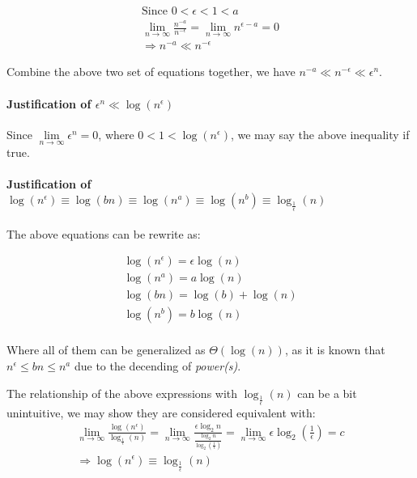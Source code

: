 \documentclass[12pt]{article}
\begin{document}
\begin{gather}
    \text{Since } 0 < \epsilon < 1 < a \\
    \lim\limits_{n \to \infty} \frac{n^{-a}}{n^{-\epsilon}} = \lim\limits_{n \to \infty} n^{\epsilon - a} = 0 \\
    \Longrightarrow n^{-a} \ll n^{-\epsilon}
\end{gather}

Combine the above two set of equations together, we have $n^{-a} \ll n^{-\epsilon} \ll \epsilon^n$.

\paragraph{Justification of $\epsilon^n \ll \log(n^\epsilon)$\newline}

Since $\lim\limits_{n \to \infty} \epsilon^n = 0$, where $0 < 1 < \log(n^\epsilon)$, we may say the above inequality if true.


\paragraph{Justification of $\log(n^\epsilon) \equiv \log(bn) \equiv \log(n^a) \equiv \log(n^b) \equiv \log_{\frac{1}{\epsilon}}(n)$\newline}

The above equations can be rewrite as:

\begin{gather}
    \log(n^\epsilon) = \epsilon \log(n) \\
    \log(n^a) = a \log(n) \\
    \log(bn) = \log(b) + \log(n) \\
    \log(n^b) = b \log(n) \\
\end{gather}

Where all of them can be generalized as $\Theta(\log(n))$, as it is known that $n^\epsilon \leq bn \leq n^a$ due to the decending of \textit{power(s)}.

The relationship of the above expressions with $\log_{\frac{1}{\epsilon}}(n)$ can be a bit unintuitive, we may show they are considered equivalent with:
\begin{gather}
    \lim\limits_{n \to \infty} \frac{\log(n^\epsilon)}{\log_{\frac{1}{\epsilon}}(n)} = \lim\limits_{n \to \infty} \frac{\epsilon \log_{2}n}{\frac{\log_{2}n}{\log_{2}(\frac{1}{\epsilon})}} = \lim\limits_{n \to \infty} \epsilon \log_2(\frac{1}{\epsilon}) = c \nonumber\\
    \Rightarrow \log(n^\epsilon) \equiv \log_{\frac{1}{\epsilon}}(n)
\end{gather}
\end{document}
